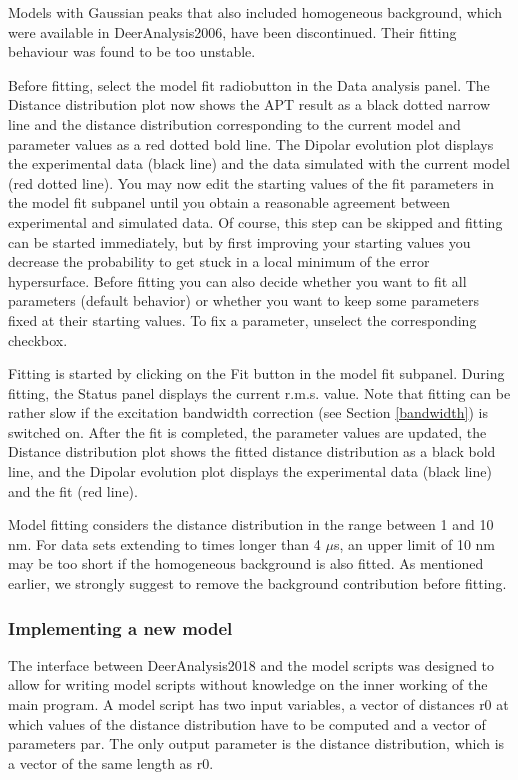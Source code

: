 \documentclass{article}
\begin{document}
Models with Gaussian peaks that also included homogeneous background, which were available in DeerAnalysis2006, have been discontinued. Their fitting behaviour was found to be too unstable.

Before fitting, select the {\ttfamily model fit} radiobutton in the {\ttfamily Data analysis} panel. The {\ttfamily Distance distribution} plot now shows the APT result as a black dotted narrow line and the distance distribution corresponding to the current model and parameter values as a red dotted bold line. The {\ttfamily Dipolar evolution} plot displays the experimental data (black line) and the data simulated with the current model (red dotted line). You may now edit the starting values of the fit parameters in the {\ttfamily model fit} subpanel until you obtain a reasonable agreement between experimental and simulated data. Of course, this step can be skipped and fitting can be started immediately, but by first improving your starting values you decrease the probability to get stuck in a local minimum of the error hypersurface. Before fitting you can also decide whether you want to fit all parameters (default behavior) or whether you want to keep some parameters fixed at their starting values. To fix a parameter, unselect the corresponding checkbox.

Fitting is started by clicking on the {\ttfamily Fit} button in the {\ttfamily model fit} subpanel. During fitting, the {\ttfamily Status} panel displays the current r.m.s. value. Note that fitting can be rather slow if the excitation bandwidth correction (see Section \ref{bandwidth}) is switched on. After the fit is completed, the parameter values are updated, the {\ttfamily Distance distribution} plot shows the fitted distance distribution as a black bold line, and the {\ttfamily Dipolar evolution} plot displays the experimental data (black line) and the fit (red line).   

Model fitting considers the distance distribution in the range between 1 and 10 nm. For data sets extending to times longer than 4 $\mu$s, an upper limit of 10 nm may be too short if the homogeneous background is also fitted. As mentioned earlier, we strongly suggest to remove the background contribution before fitting.  
   
\subsubsection{Implementing a new model}
\label{new_model}   
The interface between DeerAnalysis2018 and the model scripts was designed to allow for writing model scripts without knowledge on the inner working of the main program. A model script has two input variables, a vector of distances {\ttfamily r0} at which values of the distance distribution have to be computed and a vector of parameters {\ttfamily par}. The only output parameter is the distance distribution, which is a vector of the same length as {\ttfamily r0}. 
\end{document}
